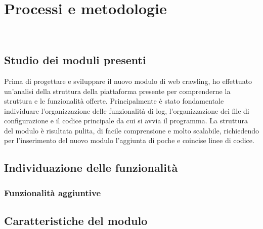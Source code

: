 
\chapter{Processi e metodologie}
\label{cap:processi-metodologie}

\\

\section{Studio dei moduli presenti}

Prima di progettare e sviluppare il nuovo modulo di web crawling, ho effettuato un’analisi della struttura della piattaforma presente per comprenderne la struttura e le funzionalità offerte. Principalmente è stato fondamentale individuare l'organizzazione delle funzionalità di log, l'organizzazione dei file di configurazione e il codice principale da cui si avvia il programma. La struttura del modulo è risultata pulita, di facile comprensione e molto scalabile, richiedendo per l'inserimento del nuovo modulo l'aggiunta di poche e coincise linee di codice.

\section{Individuazione delle funzionalità}



\subsection{Funzionalità aggiuntive}

\section{Caratteristiche del modulo}

